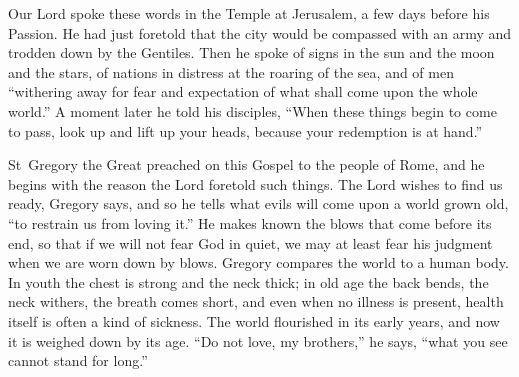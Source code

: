 \raggedcolumns

Our Lord spoke these words in the Temple at Jerusalem, a few days before his
Passion. He had just foretold that the city would be compassed with an army
and trodden down by the Gentiles. Then he spoke of signs in the sun and the
moon and the stars, of nations in distress at the roaring of the sea, and of
men ``withering away for fear and expectation of what shall come upon the
whole world.'' A moment later he told his disciples, ``When these things begin
to come to pass, look up and lift up your heads, because your redemption is at
hand.''

St~Gregory the Great preached on this Gospel to the people of Rome, and he
begins with the reason the Lord foretold such things. The Lord wishes to find
us ready, Gregory says, and so he tells what evils will come upon a world grown
old, ``to restrain us from loving it.'' He makes known the blows that come
before its end, so that if we will not fear God in quiet, we may at least fear
his judgment when we are worn down by blows. Gregory compares the world to a
human body. In youth the chest is strong and the neck thick; in old age the back
bends, the neck withers, the breath comes short, and even when no illness is
present, health itself is often a kind of sickness. The world flourished in
its early years, and now it is weighed down by its age. ``Do not love, my
brothers,'' he says, ``what you see cannot stand for long.''

